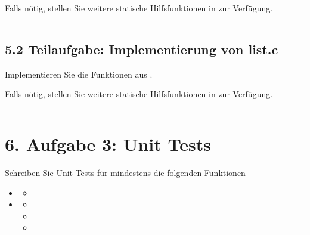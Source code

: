 \documentclass[a4paper,10pt,english]{report}
\begin{document}
\sphinxAtStartPar
Falls nötig, stellen Sie weitere statische Hilfsfunktionen in  zur Verfügung.


\bigskip\hrule\bigskip



\subsection{5.2	Teilaufgabe: Implementierung von list.c}
\label{\detokenize{P06_Personen_Verwaltung_Linked_List/README:teilaufgabe-implementierung-von-list-c}}
\sphinxAtStartPar
Implementieren Sie die Funktionen aus .

\sphinxAtStartPar
Falls nötig, stellen Sie weitere statische Hilfsfunktionen in  zur Verfügung.


\bigskip\hrule\bigskip



\section{6. Aufgabe 3: Unit Tests}
\label{\detokenize{P06_Personen_Verwaltung_Linked_List/README:aufgabe-3-unit-tests}}
\sphinxAtStartPar
Schreiben Sie Unit Tests für mindestens die folgenden Funktionen
\begin{itemize}
\item {} 
\sphinxAtStartPar
{}
\begin{itemize}
\item {} 
\sphinxAtStartPar
{}

\end{itemize}

\item {} 
\sphinxAtStartPar
{}
\begin{itemize}
\item {} 
\sphinxAtStartPar
{}

\item {} 
\sphinxAtStartPar
{}

\item {} 
\sphinxAtStartPar
{}

\end{itemize}

\end{itemize}
\end{document}
